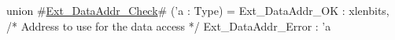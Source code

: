 union #\hyperref[sailRISCVzExtzyDataAddrzyCheck]{Ext\_DataAddr\_Check}# ('a : Type) = {
  Ext_DataAddr_OK : xlenbits,    /* Address to use for the data access */
  Ext_DataAddr_Error : 'a
}
